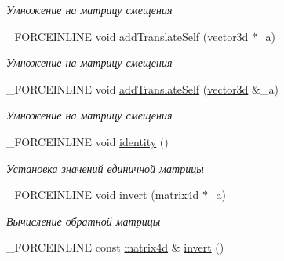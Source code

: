 \begin{DoxyCompactItemize}
\begin{DoxyCompactList}\small\item\em Умножение на матрицу смещения \end{DoxyCompactList}\item 
\hypertarget{classbt_1_1matrix4d_a8a652de50736fb2cbd9f491625e86e94}{\-\_\-\-F\-O\-R\-C\-E\-I\-N\-L\-I\-N\-E void \hyperlink{classbt_1_1matrix4d_a8a652de50736fb2cbd9f491625e86e94}{add\-Translate\-Self} (\hyperlink{classbt_1_1vector3d}{vector3d} $\ast$\-\_\-a)}\label{classbt_1_1matrix4d_a8a652de50736fb2cbd9f491625e86e94}

\begin{DoxyCompactList}\small\item\em Умножение на матрицу смещения \end{DoxyCompactList}\item 
\hypertarget{classbt_1_1matrix4d_ac8f3ab439fd4a7cb82afeaa854bb571b}{\-\_\-\-F\-O\-R\-C\-E\-I\-N\-L\-I\-N\-E void \hyperlink{classbt_1_1matrix4d_ac8f3ab439fd4a7cb82afeaa854bb571b}{add\-Translate\-Self} (\hyperlink{classbt_1_1vector3d}{vector3d} \&\-\_\-a)}\label{classbt_1_1matrix4d_ac8f3ab439fd4a7cb82afeaa854bb571b}

\begin{DoxyCompactList}\small\item\em Умножение на матрицу смещения \end{DoxyCompactList}\item 
\hypertarget{classbt_1_1matrix4d_ac7c395ce9e0993f62c53472c713a7f59}{\-\_\-\-F\-O\-R\-C\-E\-I\-N\-L\-I\-N\-E void \hyperlink{classbt_1_1matrix4d_ac7c395ce9e0993f62c53472c713a7f59}{identity} ()}\label{classbt_1_1matrix4d_ac7c395ce9e0993f62c53472c713a7f59}

\begin{DoxyCompactList}\small\item\em Установка значений единичной матрицы \end{DoxyCompactList}\item 
\hypertarget{classbt_1_1matrix4d_af9fb30d5e2910c9b3ec3e6ec95811978}{\-\_\-\-F\-O\-R\-C\-E\-I\-N\-L\-I\-N\-E void \hyperlink{classbt_1_1matrix4d_af9fb30d5e2910c9b3ec3e6ec95811978}{invert} (\hyperlink{classbt_1_1matrix4d}{matrix4d} $\ast$\-\_\-a)}\label{classbt_1_1matrix4d_af9fb30d5e2910c9b3ec3e6ec95811978}

\begin{DoxyCompactList}\small\item\em Вычисление обратной матрицы \end{DoxyCompactList}\item 
\hypertarget{classbt_1_1matrix4d_a36352ad06a3825c72419ce6f9427b78f}{\-\_\-\-F\-O\-R\-C\-E\-I\-N\-L\-I\-N\-E const \hyperlink{classbt_1_1matrix4d}{matrix4d} \& \hyperlink{classbt_1_1matrix4d_a36352ad06a3825c72419ce6f9427b78f}{invert} ()}\label{classbt_1_1matrix4d_a36352ad06a3825c72419ce6f9427b78f}


\end{DoxyCompactItemize}
